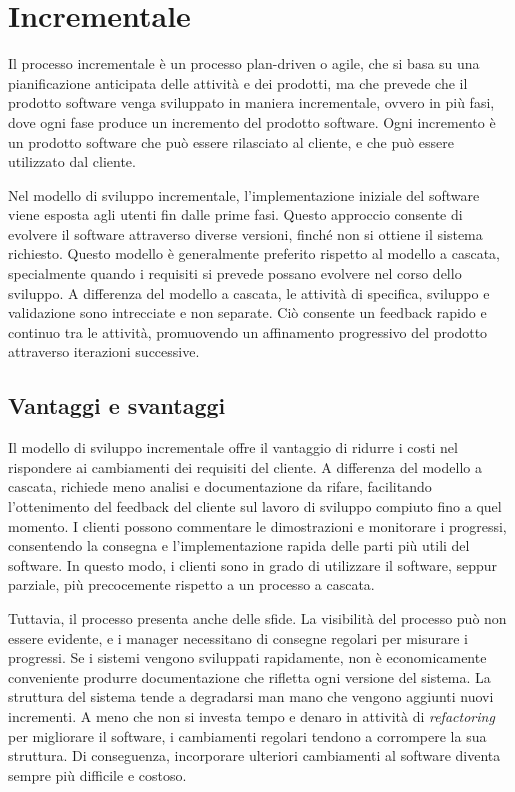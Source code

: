 \section{Incrementale}
Il processo incrementale è un processo plan-driven o agile, che si basa su una pianificazione
anticipata delle attività e dei prodotti, ma che prevede che il prodotto software
venga sviluppato in maniera incrementale, ovvero in più fasi, dove ogni fase
produce un incremento del prodotto software. Ogni incremento è un prodotto software
che può essere rilasciato al cliente, e che può essere utilizzato dal cliente. 

Nel modello di sviluppo incrementale, l'implementazione iniziale del software viene esposta
agli utenti fin dalle prime fasi. Questo approccio consente di evolvere il software
attraverso diverse versioni, finché non si ottiene il sistema richiesto.
Questo modello è generalmente preferito rispetto al modello a cascata,
specialmente quando i requisiti si prevede possano evolvere nel corso dello sviluppo.
A differenza del modello a cascata, le attività di specifica, sviluppo e validazione
sono intrecciate e non separate. Ciò consente un feedback rapido e continuo tra le
attività, promuovendo un affinamento progressivo del prodotto attraverso iterazioni
successive.
\subsection{Vantaggi e svantaggi}

Il modello di sviluppo incrementale offre il vantaggio di ridurre i costi
nel rispondere ai cambiamenti dei requisiti del cliente. A differenza del
modello a cascata, richiede meno analisi e documentazione da rifare, facilitando
l'ottenimento del feedback del cliente sul lavoro di sviluppo compiuto fino a quel
momento. I clienti possono commentare le dimostrazioni e monitorare i progressi,
consentendo la consegna e l'implementazione rapida delle parti più utili del software.
In questo modo, i clienti sono in grado di utilizzare il software, seppur parziale,
più precocemente rispetto a un processo a cascata.

Tuttavia, il processo presenta anche delle sfide. La visibilità del processo può
non essere evidente, e i manager necessitano di consegne regolari per misurare i
progressi. Se i sistemi vengono sviluppati rapidamente, non è economicamente conveniente
produrre documentazione che rifletta ogni versione del sistema. La struttura del sistema
tende a degradarsi man mano che vengono aggiunti nuovi incrementi. A meno che non si
investa tempo e denaro in attività di \textit{refactoring} per migliorare il software,
i cambiamenti regolari tendono a corrompere la sua struttura. Di conseguenza,
incorporare ulteriori cambiamenti al software diventa sempre più difficile e costoso.

